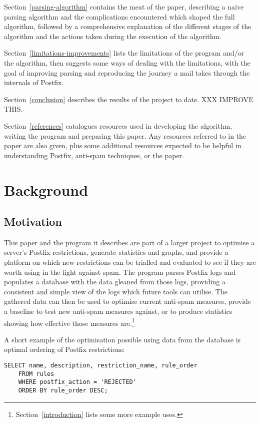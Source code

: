 \documentclass[a4paper,12pt,draft]{article}
\begin{document}
Section~\ref{parsing-algorithm} contains the meat of the paper, describing
a naive parsing algorithm and the complications encountered which shaped
the full algorithm, followed by a comprehensive explanation of the
different stages of the algorithm and the actions taken during the
execution of the algorithm.

Section~\ref{limitations-improvements} lists the limitations of the program
and/or the algorithm, then suggests some ways of dealing with the
limitations, with the goal of improving parsing and reproducing the journey
a mail takes through the internals of Postfix.

Section~\ref{conclusion} describes the results of the project to date.  XXX
IMPROVE THIS\@.

Section~\ref{references} catalogues resources used in developing the
algorithm, writing the program and preparing this paper.  
Any resources referred to in the paper are also given, plus some additional
resources expected to be helpful in understanding Postfix, anti-spam
techniques, or the paper.

\section{Background}

\label{background}

\subsection{Motivation}

This paper and the program it describes are part of a larger project to
optimise a server's Postfix restrictions, generate statistics and graphs,
and provide a platform on which new restrictions can be trialled and
evaluated to see if they are worth using in the fight against spam.  The
program parses Postfix logs and populates a database with the data gleaned
from those logs, providing a consistent and simple view of the logs which
future tools can utilise.  The gathered data can then be used to optimise
current anti-spam measures, provide a baseline to test new anti-spam
measures against, or to produce statistics showing how effective those
measures are.\footnote{Section~\ref{introduction} lists some more example
uses.}

A short example of the optimisation possible using data from the database
is optimal ordering of Postfix restrictions:

\begin{verbatim}
SELECT name, description, restriction_name, rule_order
    FROM rules
    WHERE postfix_action = 'REJECTED'
    ORDER BY rule_order DESC;
\end{verbatim}
\end{document}
